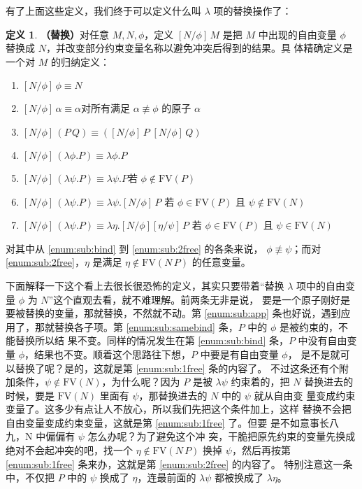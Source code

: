 \documentclass[a4paper,adobefonts]{ctexart}
\newenvironment{tightenum}{
  \begin{enumerate}
    \setlength{\itemsep}{0cm}
    \setlength{\parskip}{0cm}
    \setlength{\itemindent}{2\ccwd}
}{
  \end{enumerate}
}
\theoremstyle{definition}
\newtheorem{definition}{定义}
\begin{document}
有了上面这些定义，我们终于可以定义什么叫 $\lambda$ 项的替换操作了：
\begin{definition}{\bfseries{（替换）}}\label{def:sub}
  对任意 $M,N,\phi$，定义 $[N/\phi]\,M$ 是把 $M$ 中出现的自由变量
  $\phi$ 替换成 $N$，并改变部分约束变量名称以避免冲突后得到的结果。具
  体精确定义是一个对 $M$ 的归纳定义：
  \begin{tightenum}
    \item $[N/\phi]\,\phi\equiv N$
    \item $[N/\phi]\,\alpha\equiv\alpha$\hfill 对所有满足
      $\alpha\not\equiv\phi$ 的原子 $\alpha$
    \item $[N/\phi]\,(P\,Q)\equiv([N/\phi]\,P\;[N/\phi]\,Q)$\label{enum:sub:app}
    \item $[N/\phi]\,(\lambda\phi.P)\equiv\lambda\phi.P$\label{enum:sub:samebind}
    \item $[N/\phi]\,(\lambda\psi.P)\equiv\lambda\psi.P$\hfill 若
      $\phi\not\in\text{FV}(P)$\label{enum:sub:bind}
    \item
      $[N/\phi]\,(\lambda\psi.P)\equiv\lambda\psi.[N/\phi]\,P$\hfill
      若 $\phi\in\text{FV}(P)$ 且 $\psi\not\in\text{FV}(N)$\label{enum:sub:1free}
    \item
      $[N/\phi]\,(\lambda\psi.P)\equiv\lambda\eta.[N/\phi][\eta/\psi]\,P$\hfill
      若 $\phi\in\text{FV}(P)$ 且 $\psi\in\text{FV}(N)$\label{enum:sub:2free}
  \end{tightenum}
  对其中从 \ref{enum:sub:bind} 到 \ref{enum:sub:2free} 的各条来说，
  $\phi\not\equiv\psi$；而对 \ref{enum:sub:2free}，$\eta$ 是满足
  $\eta\not\in\text{FV}(N\,P)$ 的任意变量。
\end{definition}

下面解释一下这个看上去很长很恐怖的定义，其实只要带着``替换 $\lambda$
项中的自由变量 $\phi$ 为 $N$''这个直观去看，就不难理解。前两条无非是说，
要是一个原子刚好是要被替换的变量，那就替换，不然就不动。第
\ref{enum:sub:app} 条也好说，遇到应用了，那就替换各子项。第
\ref{enum:sub:samebind} 条，$P$ 中的 $\phi$ 是被约束的，不能替换所以结
果不变。同样的情况发生在第 \ref{enum:sub:bind} 条，$P$ 中没有自由变量
$\phi$，结果也不变。顺着这个思路往下想，$P$ 中要是有自由变量 $\phi$，
是不是就可以替换了呢？是的，这就是第 \ref{enum:sub:1free} 条的内容了。
不过这条还有个附加条件，$\psi\not\in\text{FV}(N)$，为什么呢？因为 $P$
是被 $\lambda\psi$ 约束着的，把 $N$ 替换进去的时候，要是
$\text{FV}(N)$ 里面有 $\psi$，那替换进去的 $N$ 中的 $\psi$ 就从自由变
量变成约束变量了。这多少有点让人不放心，所以我们先把这个条件加上，这样
替换不会把自由变量变成约束变量，这就是第 \ref{enum:sub:1free} 了。但要
是不如意事长八九，$\text{N}$ 中偏偏有 $\psi$ 怎么办呢？为了避免这个冲
突，干脆把原先约束的变量先换成绝对不会起冲突的吧，找一个
$\eta\not\in\text{FV}(N\,P)$ 换掉 $\psi$，然后再按第
\ref{enum:sub:1free} 条来办，这就是第 \ref{enum:sub:2free} 的内容了。
特别注意这一条中，不仅把 $P$ 中的 $\psi$ 换成了 $\eta$，连最前面的
$\lambda\psi$ 都被换成了 $\lambda\eta$。
\end{document}
